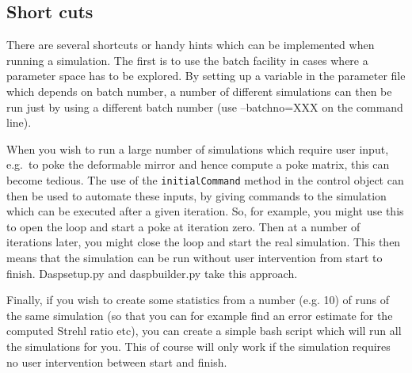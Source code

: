 \documentclass{article}
\begin{document}
\subsection{Short cuts}
There are several shortcuts or handy hints which can be implemented
when running a simulation.  The first is to use the batch facility in
cases where a parameter space has to be explored.  By setting up a
variable in the parameter file which depends on batch number, a number
of different simulations can then be run just by using a different
batch number (use --batchno=XXX on the command line).

When you wish to run a large number of simulations which require user
input, e.g.\ to poke the deformable mirror and hence compute a poke
matrix, this can become tedious.  The use of the
\texttt{initialCommand} method in the control object can then be used
to automate these inputs, by giving commands to the simulation which
can be executed after a given iteration.  So, for example, you might
use this to open the loop and start a poke at iteration zero.  Then at
a number of iterations later, you might close the loop and start the
real simulation.  This then means that the simulation can be run
without user intervention from start to finish.  Daspsetup.py and
daspbuilder.py take this approach.

Finally, if you wish to create some statistics from a number (e.g. 10)
of runs of the same simulation (so that you can for example find an
error estimate for the computed Strehl ratio etc), you can create a
simple bash script which will run all the simulations for you.  This
of course will only work if the simulation requires no user
intervention between start and finish.  



\pagebreak


\printindex
\end{document}
